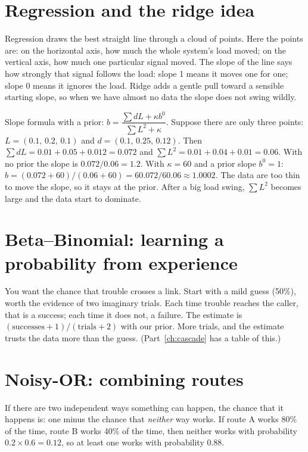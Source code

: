 \section{Regression and the ridge idea}
\begin{simplebox}
Regression draws the best straight line through a cloud of points. Here the points are: on the horizontal axis, how much the whole system's load moved; on the vertical axis, how much one particular signal moved. The slope of the line says how strongly that signal follows the load: slope 1 means it moves one for one; slope 0 means it ignores the load. Ridge adds a gentle pull toward a sensible starting slope, so when we have almost no data the slope does not swing wildly.
\end{simplebox}
\begin{examplebox}[Check it]
Slope formula with a prior: $b=\dfrac{\sum dL+\kappa b^0}{\sum L^2+\kappa}$. Suppose there are only three points: $L=(0.1,\,0.2,\,0.1)$ and $d=(0.1,\,0.25,\,0.12)$. Then $\sum dL=0.01+0.05+0.012=0.072$ and $\sum L^2=0.01+0.04+0.01=0.06$. With no prior the slope is $0.072/0.06=1.2$. With $\kappa=60$ and a prior slope $b^0=1$: $b=(0.072+60)/(0.06+60)=60.072/60.06\approx1.0002$. The data are too thin to move the slope, so it stays at the prior. After a big load swing, $\sum L^2$ becomes large and the data start to dominate.
\end{examplebox}

\section{Beta--Binomial: learning a probability from experience}
\begin{simplebox}
You want the chance that trouble crosses a link. Start with a mild guess (50\%), worth the evidence of two imaginary trials. Each time trouble reaches the caller, that is a success; each time it does not, a failure. The estimate is $(\text{successes}+1)/(\text{trials}+2)$ with our prior. More trials, and the estimate trusts the data more than the guess. (Part~\ref{ch:cascade} has a table of this.)
\end{simplebox}

\section{Noisy-OR: combining routes}
\begin{simplebox}
If there are two independent ways something can happen, the chance that it happens is: one minus the chance that \emph{neither} way works. If route A works 80\% of the time, route B works 40\% of the time, then neither works with probability $0.2\times0.6=0.12$, so at least one works with probability $0.88$.
\end{simplebox}

